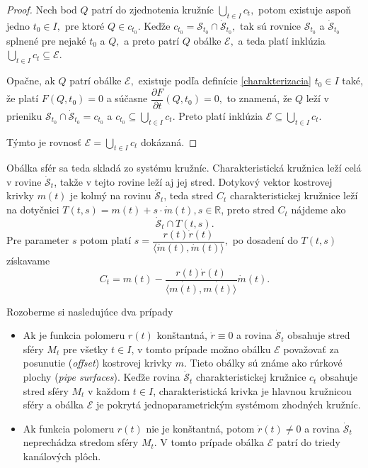 \begin{proof}
Nech bod $Q$ patrí do zjednotenia kružníc $ \bigcup_{t \in I} c_t, $ potom existuje aspoň jedno $t_0 \in I, $ pre ktoré $Q \in c_{t_0}.$ Keďže $c_{t_0} = \mathcal{S}_{t_0} \cap \mathcal{\dot{S}}_{t_0}, $ tak sú rovnice $\mathcal{S}_{t_0} $ a $ \mathcal{\dot{S}}_{t_0}$ splnené pre nejaké $t_0$ a $Q,$ a preto patrí $Q$ obálke $\mathcal{E}, $ a teda platí inklúzia $\bigcup_{t \in I} c_t \subseteq \mathcal{E}. $

Opačne, ak $Q$ patrí obálke $\mathcal{E},$ existuje podľa definície \ref{charakterizacia} $t_0 \in I $ také, že platí $F(Q,t_0) = 0$ a súčasne $\dfrac{\partial F}{\partial t}(Q, t_0)=0,$ to znamená, že $Q$ leží v prieniku $\mathcal{S}_{t_0} \cap \mathcal{\dot{S}}_{t_0} = c_{t_0} $ a $c_{t_0} \subseteq \bigcup_{t \in I} c_t. $ Preto platí inklúzia $\mathcal{E} \subseteq \bigcup_{t \in I} c_t.$ 

Týmto je rovnosť $\mathcal{E} = \bigcup_{t \in I} c_t$ dokázaná.
\end{proof}

Obálka sfér sa teda skladá zo systému kružníc. Charakteristická kružnica leží celá v rovine $\mathcal{\dot{S}}_t $, takže v tejto rovine leží aj jej stred. Dotykový vektor kostrovej krivky $m(t)$ je kolmý na rovinu $\mathcal{\dot{S}}_t$, teda stred $C_t$ charakteristickej kružnice leží na dotyčnici $T(t, s)= m(t) + s \cdot \dot{m}(t), s \in \mathbb{R}$, preto stred $C_t$ nájdeme ako
$$ \mathcal{\dot{S}}_t \cap T(t, s).$$
Pre parameter $s$ potom platí $s = \dfrac{r(t) \dot{r}(t)}{\langle \dot{m}(t), \dot{m}(t) \rangle }, $
po dosadení do $T(t, s)$ získavame
$$ C_t = m(t) - \frac{r(t) \dot{r}(t)}{\langle \dot{m(t)}, \dot{m(t)} \rangle} \dot{m}(t).$$

Rozoberme si nasledujúce dva prípady
\begin{itemize}
\item Ak je funkcia polomeru $r(t)$ konštantná, $\dot{r} \equiv 0$ a rovina $\mathcal{\dot{S}}_t$ obsahuje stred sféry $M_t$ pre všetky $t \in I$, v tomto prípade možno obálku $\mathcal{E}$ považovať za posunutie (\textit{offset}) kostrovej krivky $m$. Tieto obálky sú známe ako rúrkové plochy (\textit{pipe surfaces}). Keďže rovina $\mathcal{\dot{S}}_t$ charakteristickej kružnice $c_t$ obsahuje stred sféry $M_t$ v každom $t \in I$, charakteristická krivka je hlavnou kružnicou sféry a obálka $\mathcal{E}$ je pokrytá jednoparametrickým systémom zhodných kružníc.
\item Ak funkcia polomeru $r(t)$ nie je konštantná, potom $\dot{r}(t) \neq 0$ a rovina $\mathcal{\dot{S}}_t$  neprechádza stredom sféry $M_t$. V tomto prípade obálka $\mathcal{E}$ patrí do triedy kanálových plôch.
\end{itemize}

